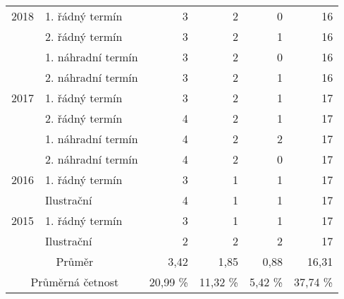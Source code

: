 \begin{table}[htbp]
\begin{tabular}{|l|l|r|r|r|r|}
        \multicolumn{ 1}{|c|}{2018} & 1. řádný termín    & 3 & 2 & 0 & 16 \\ \cline{ 2- 6}
        \multicolumn{ 1}{|l|}{}     & 2. řádný termín    & 3 & 2 & 1 & 16 \\ \cline{ 2- 6}
        \multicolumn{ 1}{|l|}{}     & 1. náhradní termín & 3 & 2 & 0 & 16 \\ \cline{ 2- 6}
        \multicolumn{ 1}{|l|}{}     & 2. náhradní termín & 3 & 2 & 1 & 16 \\ \hline
        \multicolumn{ 1}{|c|}{2017} & 1. řádný termín    & 3 & 2 & 1 & 17 \\ \cline{ 2- 6}
        \multicolumn{ 1}{|l|}{}     & 2. řádný termín    & 4 & 2 & 1 & 17 \\ \cline{ 2- 6}
        \multicolumn{ 1}{|l|}{}     & 1. náhradní termín & 4 & 2 & 2 & 17 \\ \cline{ 2- 6}
        \multicolumn{ 1}{|l|}{}     & 2. náhradní termín & 4 & 2 & 0 & 17 \\ \hline
        \multicolumn{ 1}{|c|}{2016} & 1. řádný termín    & 3 & 1 & 1 & 17 \\ \cline{ 2- 6}
        \multicolumn{ 1}{|l|}{}     & Ilustrační         & 4 & 1 & 1 & 17 \\ \hline
        \multicolumn{ 1}{|c|}{2015} & 1. řádný termín    & 3 & 1 & 1 & 17 \\ \cline{ 2- 6}
        \multicolumn{ 1}{|l|}{}     & Ilustrační         & 2 & 2 & 2 & 17 \\ \hline
        \multicolumn{ 2}{|c|}{Průměr} & 3,42 & 1,85 & 0,88 & 16,31 \\ \hline
        \multicolumn{ 2}{|c|}{Průměrná četnost} & 20,99 \% & 11,32 \% & 5,42 \% & 37,74 \% \\ \hline
    \end{tabular}
    \label{tabulka6-1}
\end{table}

